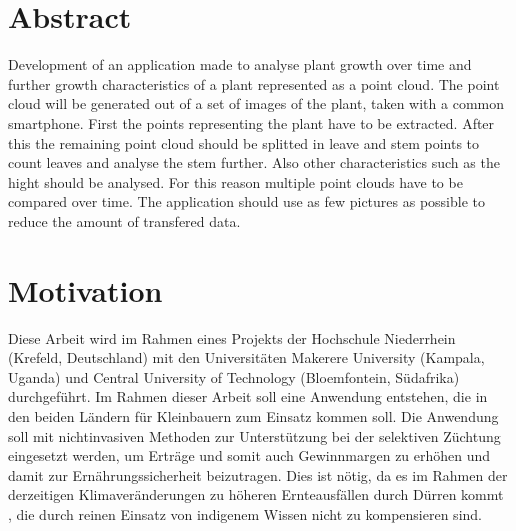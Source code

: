 \documentclass[12pt,titlepage, twoside]{article}
\begin{document}
\section*{Abstract}
Development of an application made to analyse plant growth over time and further growth characteristics of a plant represented as a point cloud. 
The point cloud will be generated out of a set of images of the plant, taken with a common smartphone.
First the points representing the plant have to be extracted.
After this the remaining point cloud should be splitted in leave and stem points to count leaves and analyse the stem further. 
Also other characteristics such as the hight should be analysed. For this reason multiple point clouds have to be compared over time.
The application should use as few pictures as possible to reduce the amount of transfered data.

\newpage

\pagestyle{plain}
\tableofcontents
\newpage

\renewcommand{\labelenumi}{\alph{enumi})} 



\section{Motivation}
\label{sec:einleitung}
Diese Arbeit wird im Rahmen eines Projekts der Hochschule Niederrhein (Krefeld, Deutschland) mit den Universitäten Makerere University (Kampala, Uganda) und Central University of Technology (Bloemfontein, Südafrika) durchgeführt.
Im Rahmen dieser Arbeit soll eine Anwendung entstehen, die in den beiden Ländern für Kleinbauern zum Einsatz kommen soll.
Die Anwendung soll mit nichtinvasiven Methoden zur Unterstützung bei der selektiven Züchtung eingesetzt werden, um Erträge und somit auch Gewinnmargen zu erhöhen und damit zur Ernährungssicherheit beizutragen.
Dies ist nötig, da es im Rahmen der derzeitigen Klimaveränderungen zu höheren Ernteausfällen durch Dürren kommt \cite{droughts}, die durch reinen Einsatz von indigenem Wissen nicht zu kompensieren sind.
\end{document}

